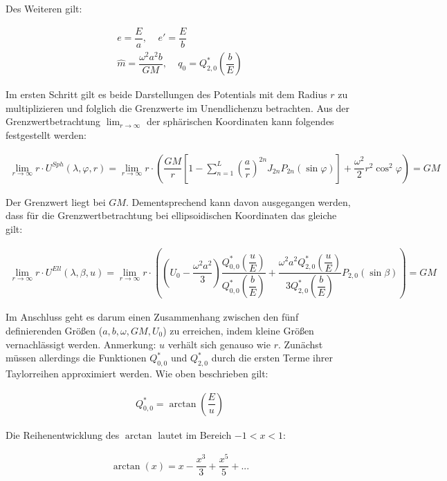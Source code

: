 Des Weiteren gilt:

\begin{gather*}
e = \dfrac{E}{a}, ~~~~~ e'= \dfrac{E}{b} \\
\hat{m} = \dfrac{\omega^2 a^2 b }{GM}, ~~~~~ q_0 = Q_{2,0}^{*} \left(\dfrac{b}{E}\right)
\end{gather*}

Im ersten Schritt gilt es beide Darstellungen des Potentials mit dem Radius $r$ zu multiplizieren und folglich die Grenzwerte 	\dq im Unendlichen\dq zu betrachten. Aus der Grenzwertbetrachtung $\lim_{r \rightarrow \infty}$ der sphärischen Koordinaten kann folgendes festgestellt werden:

\begin{align*}
\lim_{r \rightarrow \infty} r \cdot U^{Sph}(\lambda,\varphi,r) = \lim_{r \rightarrow \infty} r \cdot \left(\dfrac{GM}{r} \left[1-\sum_{n=1}^{L} \left(\dfrac{a}{r}\right)^{2n} J_{2n} P_{2n} (\sin \varphi)\right] + \dfrac{\omega^2}{2} r^2 \cos^2 \varphi\right) = GM
\end{align*}

Der Grenzwert liegt bei $GM$. Dementsprechend kann davon ausgegangen werden, dass für die Grenzwertbetrachtung bei ellipsoidischen Koordinaten das gleiche gilt:

\begin{align*}
\lim_{r \rightarrow \infty} r \cdot U^{Ell}(\lambda,\beta,u) = \lim_{r \rightarrow \infty} r \cdot \left(\left(U_0 - \dfrac{\omega^2 a^2}{3}\right) \dfrac{Q_{0,0}^{*}\left(\dfrac{u}{E}\right)}{{Q_{0,0}^{*}\left(\dfrac{b}{E}\right)}} + \dfrac{\omega^2 a^2 Q_{2,0}^{*}\left(\dfrac{u}{E}\right)}{3 Q_{2,0}^{*}\left(\dfrac{b}{E}\right)} P_{2,0}(\sin \beta)\right) = GM
\end{align*}

Im Anschluss geht es darum einen Zusammenhang zwischen den fünf definierenden Größen ($a,b,\omega,GM,U_0$) zu erreichen, indem kleine Größen vernachlässigt werden. Anmerkung: $u$ verhält sich genauso wie $r$. Zunächst müssen allerdings die Funktionen $Q_{0,0}^{*}$ und $Q_{2,0}^{*}$ durch die ersten Terme ihrer Taylorreihen approximiert werden. Wie oben beschrieben gilt: 

\begin{align*}
Q_{0,0}^{*} = \arctan \left(\dfrac{E}{u}\right)
\end{align*}

Die Reihenentwicklung des $\arctan$ lautet im Bereich $-1 < x < 1$:  

\begin{align*}
\arctan(x) = x- \dfrac{x^3}{3} + \dfrac{x^5}{5} + ...
\end{align*}

